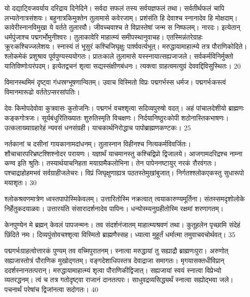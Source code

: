 यो दद्याट्विजवर्याय दरिद्राय दिनेदिने।
सर्वदा सफलं तस्य सर्वयज्ञफलं तथा।
सर्वतीर्थफलं चापि लभ्यतेनात्रसंशयः।
बहुनात्रकिमुक्तेन तुलामासे कवेरजाम्।
प्रशंसंति हि देवाश्च स्नानादेव हि मोक्षदाम्।
कावेरीस्नानविमुखा ये वर्तते तुलारवौ।
जीवच्चवाश्च ते विप्रास्तेषां जन्म स निष्फलम्।
नारदः।
इत्येतान् धर्मपुंजाश्च पद्मगर्भोमुनीश्वरः।
तुलाकावेरि माहात्म्यं समीपस्थानुवाचह।
एतस्मिन्नंतरेग्राहः क्रूरःकश्चिज्जलेशयः।
स्नास्यं तं भूसुरं कश्चिजिघृक्षुः पार्श्ववर्त्यभूत्।
मरुद्धायामाहात्म्ये तत्र पौराणिकोदिते।
श्लोकमेकं प्रशुश्राव पूर्वपुण्यस्ययोगतः।
प्रातःकाले तुलामासे यस्स्नायात्सह्यजाजले।
सर्वकर्मविनिर्मुक्तो यातिविष्णोःपरंपदम्।
इत्येतद्वचनं शृत्वा सद्यस्संक्षीणबंधनः।
त्यक्त्वा ग्राहत्वमत्युग्रं देववद्दिविसुस्थितः।
20

विमानस्थमिमं दृष्ट्वा गंधस्रग्भूषणान्वितम्।
उवाच विस्मितो विप्रः पद्मगर्भस्स धर्मज।
पद्मगर्भःकस्त्वं विमानमारूढो वर्ततेऽप्सरसांपतिः।

देवः किमोपदेवोवा कुत्रवासः कुतोजनिः।
पद्मगर्भ वचश्शृत्वा सदिव्यपुरुषो वदत्।
अहं पांचालदेशीयो ब्राह्मणः कङ्कगोत्रजः।
सूर्यबंधुरितिख्यातः शुरुतिस्मृति विचक्षणः।
निर्दयानिष्ठुरःकोपी शठोनास्तिकभाषणः।
उत्कलाख्याग्रहारेहं न्यवसं धनसंग्रही।
याचकार्थनिरोद्धाच पापोब्राह्मणकण्टकः।
25

नर्तकानां च दसीनां गायकानामदांधनम्।
तुलास्नान विहीनश्च नित्यकर्मविवर्जितः।
शौचाचारपरिभ्रष्टश्शिश्नोदर परायणः।
यज्ञार्थं याचमानस्तु कश्चिद्विप्रो द्विजालये।
आजगामदरिद्रश्च नाम्ना कण्व इति श्रुतिः।
तस्यार्थयाचनिहता मयाग्रामैकलोभिना।
तेन पापेननष्टायुर् नरकं रौरवंगतः।
पश्चाद्राहोहमभवं सर्वग्राहीजलेचरः।
विप्रं जिघृक्षुणाह्यत्र पठतस्तेमुखांबुजात्।
निर्गतश्श्लोकएकस्तु सुधारूपो मयाशृतः।
30

श्लोकश्रवणमात्रेण ध्वस्तपापोस्मिकेवलम्।
उत्तारितोस्मि नक्रत्वात् त्वयाकारुण्यमूर्तिना।
संतस्समदृशोलोके निर्हेतुकदयाळवः।
उत्तारयंति संसारादर्शनादेव पापिनः।
धन्योस्म्यनुग्रहीतोस्मि रक्षमां शरणागतम्।

केनपुण्येन मे ब्रह्मन् केवलं पापजन्मनः।
तव संदर्शनंजातम् माहात्म्यश्रवणं तथा।
कुतूहलेन पृच्छामि संदेहं छिंदिते नमः।
दिव्यपुंसोवचश्शृत्वा विस्मितो ब्राह्मणैस्सह।
ध्यात्वा मुहूर्तं धर्मात्मा तमुवाचवचोर्थवत्।
35

पद्मगर्भःग्राहत्वोत्तारकं पुण्यम् तव वच्मिपुरातनम्।
स्नात्वा मरुद्धायां तु सह्याद्रौ ब्राह्मणःपुरा।
अरुणोत् सह्यजास्तोत्रं पौराणिक मुखोद्गतम्।
वङ्गदेशाधिपस्तत्र देवाद्राजा समागतः।
मृगयासक्तधीविप्रान् ददर्शस्नानतत्परान्।
मरुद्धायामाहात्म्यं शृत्वा पौराणिकीद्विजात्।
सह्यजायां स्वयं स्नात्वा विप्रेभ्यो व्यतरद्धनम्।
त्वं च तत्र गतोदृष्ट्वा राजानं दानतत्परः।
साधुवद्रव्यसिद्ध्यर्थं स्नात्वा सह्योद्भवा जले।
पचनार्थं परेषांच द्विजांनत्वा सदोगतः।
40

